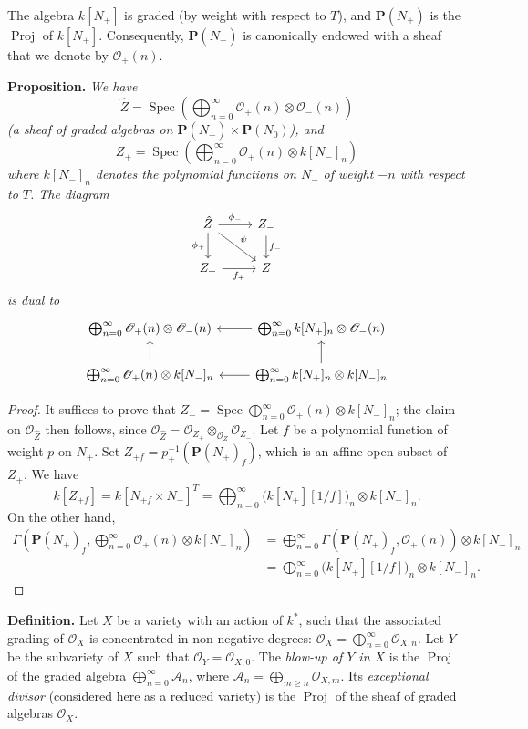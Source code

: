 \documentclass{article}
\newenvironment{itenv}[1]
  {\phantomsection\par\medskip\noindent\textbf{#1.}\itshape}
  {\par\medskip}
\newenvironment{rmenv}[1]
  {\phantomsection\par\medskip\noindent\textbf{#1.}\rmfamily}
  {\par\medskip}
\newcommand{\scr}[1]{{\mathscr{#1}}}
\newcommand{\PP}{\mathbf{P}}
\DeclareMathOperator{\Spec}{Spec}
\DeclareMathOperator{\Proj}{Proj}
\renewcommand{\geq}{\geqslant}
\newcommand{\oldpage}[1]{\marginpar{\footnotesize$\Big\vert$ \textit{p.~#1}}}
\begin{document}
The algebra $k[N_+]$ is graded (by weight with respect to $T$), and $\PP(N_+)$ is the $\Proj$ of $k[N_+]$.
Consequently, $\PP(N_+)$ is canonically endowed with a sheaf that we denote by $\scr{O}_+(n)$.

\begin{itenv}{Proposition}
  We have
  \[
    \hat{Z} = \Spec \left( \bigoplus_{n=0}^\infty \scr{O}_+(n)\otimes\scr{O}_-(n) \right)
  \]
  (a sheaf of graded algebras on $\PP(N_+)\times\PP(N_0)$), and
  \[
    Z_+ = \Spec \left( \bigoplus_{n=0}^\infty \scr{O}_+(n)\otimes k[N_-]_n \right)
  \]
  where $k[N_-]_n$ denotes the polynomial functions on $N_-$ of weight $-n$ with respect to $T$.
  The diagram
  \[
    \begin{tikzcd}
      \hat{Z} \rar["\phi_-"] \dar[swap,"\phi_+"] \drar["\psi"]
      & Z_- \dar["f_-"]
    \\Z_+ \rar[swap,"f_+"]
      & Z
    \end{tikzcd}
  \]
\oldpage{519}
  is dual to
  \[
    \begin{tikzcd}
      \bigoplus_{n=0}^\infty\scr{O}_+(n)\otimes\scr{O}_-(n)
      & \bigoplus_{n=0}^\infty k[N_+]_n\otimes\scr{O}_-(n) \lar
    \\\bigoplus_{n=0}^\infty\scr{O}_+(n)\otimes k[N_-]_n \uar
      & \bigoplus_{n=0}^\infty k[N_+]_n\otimes k[N_-]_n \uar \lar
    \end{tikzcd}
  \]
\end{itenv}

\begin{proof}
  It suffices to prove that $Z_+=\Spec\bigoplus_{n=0}^\infty\scr{O}_+(n)\otimes k[N_-]_n$;
  the claim on $\scr{O}_{\hat{Z}}$ then follows, since $\scr{O}_{\hat{Z}}=\scr{O}_{Z_+}\otimes_{\scr{O}_Z}\scr{O}_{Z_-}$.
  Let $f$ be a polynomial function of weight $p$ on $N_+$.
  Set $Z_{+f}=p_+^{-1}(\PP(N_+)_f)$, which is an affine open subset of $Z_+$.
  We have
  \[
    k[Z_{+f}]
    = k[N_{+f}\times N_-]^T
    = \bigoplus_{n=0}^\infty\big(k[N_+][1/f]\big)_n\otimes k[N_-]_n.
  \]
  On the other hand,
  \[
    \begin{aligned}
      \Gamma\left(\PP(N_+)_f, \bigoplus_{n=0}^\infty\scr{O}_+(n)\otimes k[N_-]_n\right)
      &= \bigoplus_{n=0}^\infty\Gamma\left(\PP(N_+)_f,\scr{O}_+(n)\right)\otimes k[N_-]_n
    \\&= \bigoplus_{n=0}^\infty\big(k[N_+][1/f]\big)_n\otimes k[N_-]_n.
    \end{aligned}
  \]
\end{proof}

\begin{rmenv}{Definition}
  Let $X$ be a variety with an action of $k^*$, such that the associated grading of $\scr{O}_X$ is concentrated in non-negative degrees: $\scr{O}_X=\bigoplus_{n=0}^\infty\scr{O}_{X,n}$.
  Let $Y$ be the subvariety of $X$ such that $\scr{O}_Y=\scr{O}_{X,0}$.
  The \emph{blow-up of $Y$ in $X$} is the $\Proj$ of the graded algebra $\bigoplus_{n=0}^\infty\mathcal{A}_n$, where $\mathcal{A}_n=\bigoplus_{m\geq n}\scr{O}_{X,m}$.
  Its \emph{exceptional divisor} (considered here as a reduced variety) is the $\Proj$ of the sheaf of graded algebras $\scr{O}_X$.
\end{rmenv}
\end{document}
